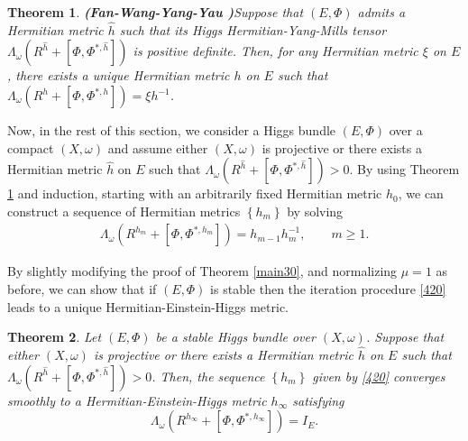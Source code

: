 \documentclass[11pt]{amsart}
\newtheorem{theorem}{Theorem}[section]
\numberwithin{equation}{section}
\theoremstyle{remark}
\newcommand{\lb}{\left (}
\newcommand{\rb}{\right )}
\newcommand{\lsb}{\left [}
\newcommand{\rsb}{\right ]}
\newcommand{\lfb}{\left \{}
\newcommand{\rfb}{\right \}}
\begin{document}
\begin{theorem} \textup{\bf (Fan-Wang-Yang-Yau \cite{WYY2})}\label{410}
 Suppose that $(E, \Phi)$ admits a Hermitian metric $\hat h$ such that its Higgs Hermitian-Yang-Mills tensor $ \Lambda_\omega \lb R^{\hat h}+ [\Phi,\Phi^{*,\hat h}]\rb$ is positive definite. Then, for any Hermitian metric $\xi$ on $E$, there exists a unique Hermitian metric $h$ on $E$ such that
$ \Lambda_\omega \lb R^{h}+ [\Phi,\Phi^{*,h}]\rb=\xi h^{-1}$.
\end{theorem}


Now, in the rest of this section, we consider a Higgs bundle $(E, \Phi)$ over a compact $(X, \omega)$ and assume either $(X, \omega)$ is projective or there exists a Hermitian metric $\hat h$ on $E$ such that $\Lambda_\omega \lb R^{\hat h}+\lsb \Phi,\Phi^{*,\hat h}\rsb\rb>0$.
By using Theorem \ref{410} and induction, starting with an arbitrarily fixed Hermitian metric $h_0$, we can construct a sequence of Hermitian metrics $\lfb h_m\rfb$ by solving
\begin{eqnarray}\label{420}
\Lambda_\omega \lb R^{h_m}+ [\Phi,\Phi^{*,h_m}]\rb=h_{m-1}h_m^{-1}, \qquad m\geq 1.
\end{eqnarray}

By slightly modifying the proof of Theorem \ref{main30}, and normalizing $\mu=1$ as before, we can show that if $(E, \Phi)$ is stable then the iteration procedure \eqref{420} leads to a unique Hermitian-Einstein-Higgs metric.

\begin{theorem} \label{415}
Let $(E, \Phi)$ be a stable Higgs bundle over $(X, \omega)$. Suppose that either $(X, \omega)$ is projective or there exists a Hermitian metric $\hat h$ on $E$ such that $\Lambda_\omega \lb R^{\hat h}+\lsb \Phi,\Phi^{*,\hat h}\rsb\rb>0$. Then, the sequence $\lfb h_m\rfb$ given by \eqref{420} converges smoothly to a Hermitian-Einstein-Higgs metric $h_\infty$ satisfying
\[
\Lambda_\omega \lb R^{h_\infty}+\lsb \Phi,\Phi^{*,{h_\infty}}\rsb\rb=I_E.
\]
\end{theorem}
\end{document}
